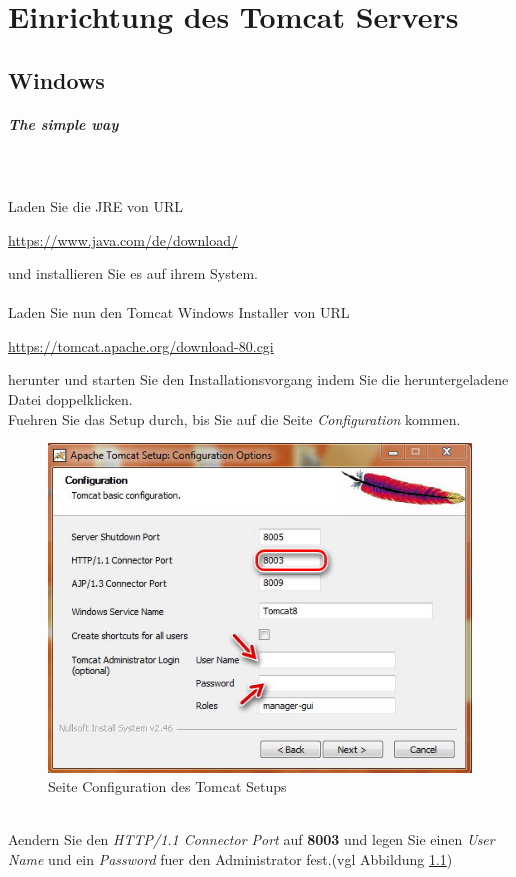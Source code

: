 \documentclass[a4paper, 12pt]{scrreprt}
\begin{document}
\chapter{Einrichtung des Tomcat Servers}
\section{Windows}
\paragraph{The simple way}\ \\
\ \\
Laden Sie die JRE von URL
\begin{center}
	 \url{https://www.java.com/de/download/}
\end{center}
und installieren Sie es auf ihrem System.\ \\
\ \\
Laden Sie nun den Tomcat Windows Installer von URL 
\begin{center}
	\url{https://tomcat.apache.org/download-80.cgi}
\end{center}
herunter und starten Sie den Installationsvorgang indem Sie die heruntergeladene Datei doppelklicken.\\
Fuehren Sie das Setup durch, bis Sie auf die Seite {\it Configuration} kommen.
\begin{figure}[h]
\centering
\includegraphics[width=0.75\linewidth]{Grafiken/TomcatInstall1}
\caption{Seite Configuration des Tomcat Setups}
\label{fig:TomcatInstall1}
\end{figure}\\
Aendern Sie den {\it HTTP/1.1 Connector Port} auf \textbf{8003} und legen Sie einen {\it User Name} und ein {\it Password} fuer den Administrator fest.(vgl Abbildung \ref{fig:TomcatInstall1})\\
\end{document}
